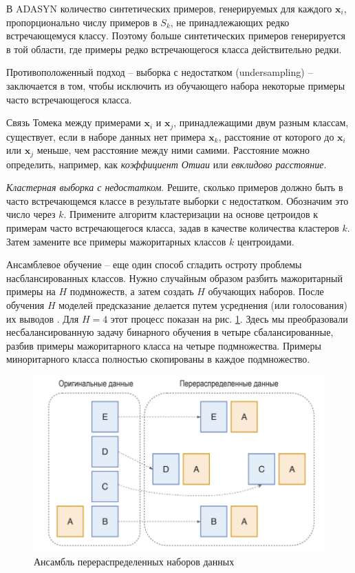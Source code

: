 \documentclass[%
	11pt,
	a4paper,
	utf8,
		]{article}
\begin{document}
В ADASYN количество синтетических примеров, генерируемых для каждого $ \mathbf{x}_i $, пропорционально числу примеров в $ S_k $, не принадлежающих редко встречающемуся классу. Поэтому больше синтетических примеров генерируется в той области, где примеры редко встречающегося класса действительно редки.

Противоположенный подход -- выборка с недостатком (undersampling) -- заключается в том, чтобы исключить из обучающего набора некоторые примеры часто встречающегося класса.

Связь Томека между примерами $ \mathbf{x}_i $ и $ \mathbf{x}_j $, принадлежащими двум разным классам, существует, если в наборе данных нет примера $ \mathbf{x}_k $, расстояние от которого до $ \mathbf{x}_i $ или $ \mathbf{x}_j $ меньше, чем расстояние между ними самими. Расстояние можно определить, например, как \emph{коэффициент Отиаи} или \emph{евклидово расстояние}.

\emph{Кластерная выборка с недостатком}. Решите, сколько примеров должно быть в часто встречающемся классе в результате выборки с недостатком. Обозначим это число через $ k $. Примените алгоритм кластеризации на основе цетроидов к примерам часто встречающегося класса, задав в качестве количества кластеров $ k $. Затем замените все примеры мажоритарных классов $ k $ центроидами. 

Ансамблевое обучение -- еще один способ сгладить остроту проблемы насблансированных классов. Нужно случайным образом разбить мажоритарный примеры на $ H $ подмножеств, а затем создать $ H $ обучающих наборов. После обучения $ H $ моделей предсказание делается путем усреднения (или голосования) их выводов \cite[]{burkov-engineer:2022}. Для $ H = 4 $ этот процесс показан на рис. \ref{fig:imbalanced_h4}. Здесь мы преобразовали несбалансированную задачу бинарного обучения в четыре сбалансированные, разбив примеры мажоритарного класса на четыре подмножества. Примеры миноритарного класса полностью скопированы в каждое подмножество.

\begin{figure}[h]
	\centering
	\includegraphics[scale=0.6]{figures/imbalanced_h4.png}
	\caption{ Ансамбль перераспределенных наборов данных }\label{fig:imbalanced_h4}
\end{figure}
\end{document}
